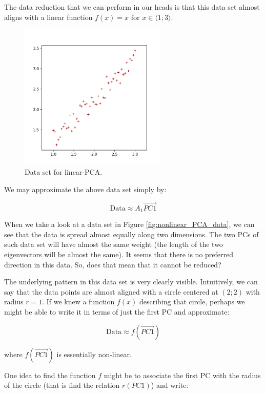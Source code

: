 \documentclass[10pt,twocolumn]{article}
\begin{document}
The data reduction that we can perform in our heads is that this data set almost aligns with a linear function $f(x) = x$ for $x \in \langle 1; 3 \rangle$.

\begin{figure}[H]
\centering\includegraphics[width=7cm]{../python/PCA-fake-datasets/PCA_linear_scatter_1.png}
\caption{Data set for linear-PCA.}			
\label{fig:linear_PCA_data}
\end{figure}

We may approximate the above data set simply by:

\begin{equation}
\text{Data} \approx A_1 \vec{PC1}
\end{equation}

When we take a look at a data set in Figure \ref{fig:nonlinear_PCA_data}, we can see that the data is spread almost equally along two dimensions. The two PCs of such data set will have almost the same weight (the length of the two eigenvectors will be almost the same). It seems that there is no preferred direction in this data. So, does that mean that it cannot be reduced?

The underlying pattern in this data set is very clearly visible. Intuitively, we can say that the data points are almost aligned with a circle centered at $(2;2)$ with radius $r=1$. If we knew a function $f(x)$ describing that circle, perhaps we might be able to write it in terms of just the first PC and approximate:

\begin{equation}
\text{Data} \approx f(\vec{PC1})
\end{equation}

where $f(\vec{PC1})$ is essentially non-linear.

One idea to find the function $f$ might be to associate the first PC with the radius of the circle (that is find the relation $r(PC1)$) and write:
\end{document}

